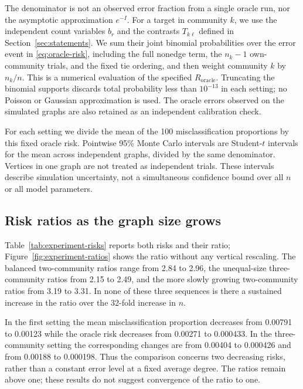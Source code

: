 The denominator is not an observed error fraction from a single oracle
run, nor the asymptotic approximation $e^{-I}$. For a target in community
$k$, we use the independent count variables $b_{r}$ and the
contrasts $T_{k\ell}$ defined in Section~\ref{sec:statements}.
We sum their joint binomial probabilities over the error event in
\eqref{eq:oracle-risk}, including the full nonedge term, the $n_k-1$
own-community trials, and the fixed tie ordering, and then weight
community $k$ by $n_k/n$. This is a numerical evaluation of the specified
$R_{\mathrm{oracle}}$. Truncating the binomial supports discards total
probability less than $10^{-13}$ in each setting; no Poisson or Gaussian
approximation is used. The oracle errors observed on the simulated graphs
are also retained as an independent calibration check.

For each setting we divide the mean of the 100 misclassification
proportions by this fixed oracle risk. Pointwise 95\% Monte Carlo intervals
are Student-$t$ intervals for the mean across independent graphs, divided
by the same denominator. Vertices in one graph are not treated as
independent trials. These intervals describe simulation uncertainty,
not a simultaneous confidence bound over all $n$ or all model parameters.

\subsection{Risk ratios as the graph size grows}

Table~\ref{tab:experiment-risks} reports both risks and their ratio;
Figure~\ref{fig:experiment-ratios} shows the ratio without any vertical
rescaling. The balanced two-community ratios range from 2.84 to 2.96,
the unequal-size three-community ratios from 2.15 to 2.49, and the
more slowly growing two-community ratios from 3.19 to 3.31. In none
of these three sequences is there a sustained increase in the ratio
over the 32-fold increase in $n$.

In the first setting the mean misclassification proportion decreases
from 0.00791 to 0.00123 while the oracle risk decreases from 0.00271
to 0.000433. In the three-community setting the corresponding changes
are from 0.00404 to 0.000426 and from 0.00188 to 0.000198.
Thus the comparison concerns two decreasing risks, rather than a
constant error level at a fixed average degree. The ratios remain
above one; these results do not suggest convergence of the ratio to one.

